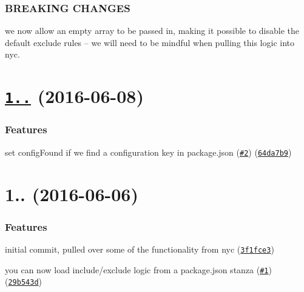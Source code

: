 \subsubsection*{B\+R\+E\+A\+K\+I\+NG C\+H\+A\+N\+G\+ES}


\begin{DoxyItemize}
\item we now allow an empty array to be passed in, making it possible to disable the default exclude rules -- we will need to be mindful when pulling this logic into nyc.
\end{DoxyItemize}

\label{_1.1.0}%
 \section*{\href{https://github.com/bcoe/test-exclude/compare/v1.0.0...v1.1.0}{\tt 1..} (2016-\/06-\/08)}

\subsubsection*{Features}


\begin{DoxyItemize}
\item set config\+Found if we find a configuration key in package.\+json (\href{https://github.com/bcoe/test-exclude/issues/2}{\tt \#2}) (\href{https://github.com/bcoe/test-exclude/commit/64da7b9}{\tt 64da7b9})
\end{DoxyItemize}

\label{_1.0.0}%
 \section*{1.. (2016-\/06-\/06)}

\subsubsection*{Features}


\begin{DoxyItemize}
\item initial commit, pulled over some of the functionality from nyc (\href{https://github.com/bcoe/test-exclude/commit/3f1fce3}{\tt 3f1fce3})
\item you can now load include/exclude logic from a package.\+json stanza (\href{https://github.com/bcoe/test-exclude/issues/1}{\tt \#1}) (\href{https://github.com/bcoe/test-exclude/commit/29b543d}{\tt 29b543d}) 
\end{DoxyItemize}